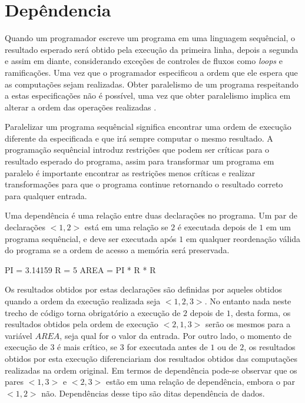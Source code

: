 
\section{Depêndencia}

Quando um programador escreve um programa em uma linguagem sequêncial, o
resultado esperado será obtido pela execução da primeira linha, depois a segunda
e assim em diante, considerando exceções de controles de fluxos como
\textit{loops} e ramificações. 
Uma vez que o programador especificou a ordem que ele espera que as computações 
sejam realizadas. 
Obter paralelismo de um programa respeitando a estas especificações não é
possível, uma vez que obter paralelismo implica em alterar a ordem das
operações realizadas \cite[1.8]{ocfma}.

Paralelizar um programa sequêncial significa encontrar uma ordem de execução
diferente da especificada e que irá sempre computar o mesmo resultado.
A programação sequêncial introduz restrições que podem ser críticas para o
resultado esperado do programa, assim para transformar um programa em paralelo é
importante encontrar as restrições menos críticas e realizar transformações para
que o programa continue retornando o resultado correto para qualquer entrada.



Uma dependência é uma relação entre duas declarações no programa. 
Um par de declarações $<1,2>$ está em uma relação se $2$ é executada 
depois de $1$ em um programa sequêncial, e deve ser executada após $1$ 
em qualquer reordenação válida do programa se a ordem de acesso a 
memória será preservada.

\begin{algorithm}
        \begin{algorithmic}[1]
                \STATE PI = 3.14159
                \STATE R = 5
                \STATE AREA = PI * R * R
\end{algorithmic}
\end{algorithm}


Os resultados obtidos por estas declarações são definidas por aqueles obtidos
quando a ordem da execução realizada seja $<1,2,3>$. 
No entanto nada neste trecho de código torna obrigatório a execução de 
$2$ depois de $1$, desta forma, os resultados obtidos pela ordem de execução 
$<2,1,3>$ serão os mesmos para a variável $AREA$, seja qual for o valor 
da entrada.
Por outro lado, o momento de execução de $3$ é mais crítico, se $3$ for
executada antes de $1$ ou de $2$, os resultados obtidos por esta execução
diferenciariam dos resultados obtidos das computações realizadas na ordem
original.
Em termos de dependência pode-se observar que os pares $<1,3>$ e $<2,3>$
estão em uma relação de dependência, embora o par $<1,2>$ não.
Dependências desse tipo são ditas dependência de dados.

